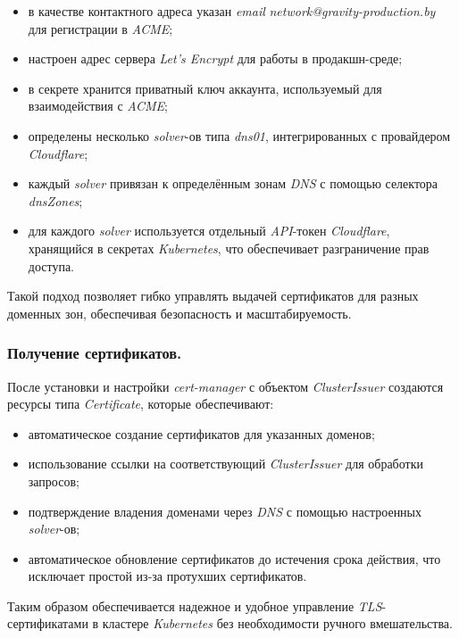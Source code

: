 \begin{itemize}
    \item в качестве контактного адреса указан \textit{email} \textit{network@gravity-production.by} для регистрации в \textit{ACME};
    \item настроен адрес сервера \textit{Let's Encrypt} для работы в продакшн-среде;
    \item в секрете хранится приватный ключ аккаунта, используемый для взаимодействия с \textit{ACME};
    \item определены несколько \textit{solver}-ов типа \textit{dns01}, интегрированных с провайдером \textit{Cloudflare};
    \item каждый \textit{solver} привязан к определённым зонам \textit{DNS} с помощью селектора \textit{dnsZones};
    \item для каждого \textit{solver} используется отдельный \textit{API}-токен \textit{Cloudflare}, хранящийся в секретах \textit{Kubernetes}, что обеспечивает разграничение прав доступа.
\end{itemize}

Такой подход позволяет гибко управлять выдачей сертификатов для разных доменных зон, обеспечивая безопасность и масштабируемость.

\subsubsection{Получение сертификатов.} После установки и настройки \textit{cert-manager} с объектом \textit{ClusterIssuer} создаются ресурсы типа \textit{Certificate}, которые обеспечивают:

\begin{itemize}
    \item автоматическое создание сертификатов для указанных доменов;
    \item использование ссылки на соответствующий \textit{ClusterIssuer} для обработки запросов;
    \item подтверждение владения доменами через \textit{DNS} с помощью настроенных \textit{solver}-ов;
    \item автоматическое обновление сертификатов до истечения срока действия, что исключает простой из-за протухших сертификатов.
\end{itemize}

Таким образом обеспечивается надежное и удобное управление \textit{TLS}-сертификатами в кластере \textit{Kubernetes} без необходимости ручного вмешательства.



